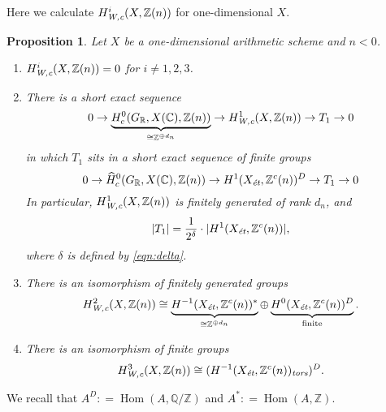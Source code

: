 \documentclass{article}
\DeclareMathOperator{\Hom}{Hom}
\newcommand{\CC}{\mathbb{C}}
\newcommand{\QQ}{\mathbb{Q}}
\newcommand{\RR}{\mathbb{R}}
\newcommand{\ZZ}{\mathbb{Z}}
\newcommand{\et}{\text{\it \'{e}t}}
\newcommand{\tors}{\text{\it tors}}
\newcommand{\Wc}{\text{\it W,c}}
\newcommand{\dfn}{\mathrel{\mathop:}=}
\theoremstyle{myplain}
\newtheorem{proposition}[theorem]{Proposition}
\theoremstyle{mydefinition}
\begin{document}
Here we calculate $H^i_\Wc (X, \ZZ(n))$ for one-dimensional $X$.

\begin{proposition}
  \label{prop:calculation-of-H-Wc}
  Let $X$ be a one-dimensional arithmetic scheme and $n < 0$.

  \begin{enumerate}
  \item[0)] $H^i_\Wc (X, \ZZ(n)) = 0$ for $i \ne 1,2,3$.

  \item[1)] There is a short exact sequence
    \begin{equation}
      \label{eqn:H1Wc-ses}
      0 \to \underbrace{H^0_c (G_\RR, X(\CC), \ZZ(n))}_{\cong \ZZ^{\oplus d_n}} \to
      H^1_\Wc (X, \ZZ(n)) \to T_1 \to 0
    \end{equation}
    in which $T_1$ sits in a short exact sequence of finite groups
    \[ 0 \to \widehat{H}^0_c (G_\RR, X(\CC), \ZZ(n)) \to
      H^1 (X_\et, \ZZ^c(n))^D \to
      T_1 \to 0 \]
    In particular, $H^1_\Wc (X, \ZZ(n))$ is finitely generated of rank $d_n$,
    and
    $$|T_1| = \frac{1}{2^\delta}\cdot |H^1 (X_\et, \ZZ^c (n))|,$$
    where $\delta$ is defined by \eqref{eqn:delta}.

  \item[2)] There is an isomorphism of finitely generated groups
    \[ H^2_\Wc (X, \ZZ(n)) \cong
      \underbrace{H^{-1} (X_\et, \ZZ^c(n))^*}_{\cong \ZZ^{\oplus d_n}}
      \oplus
      \underbrace{H^0 (X_\et, \ZZ^c(n))^D}_{\text{finite}}. \]

  \item[3)] There is an isomorphism of finite groups
    $$H^3_\Wc (X, \ZZ(n)) \cong (H^{-1} (X_\et, \ZZ^c(n))_\tors)^D.$$
  \end{enumerate}
\end{proposition}

We recall that $A^D \dfn \Hom (A, \QQ/\ZZ)$ and $A^* \dfn \Hom (A, \ZZ)$.
\end{document}
